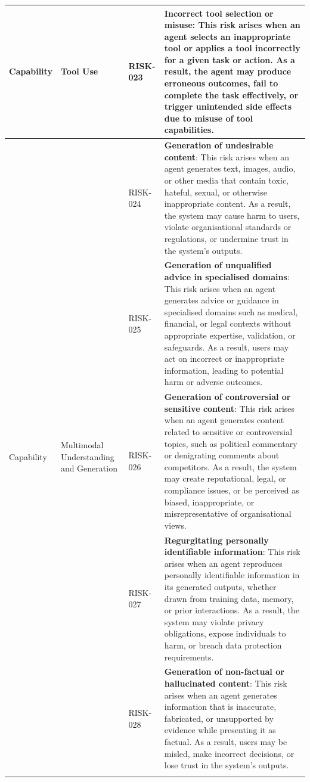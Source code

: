 \documentclass{article}
\begin{document}
\begin{longtable}{|p{}|p{}|p{}|p{}|}
\multirow{1}{=}{Capability}
& \multirow{1}{=}{Tool Use}
& RISK-023 & \textbf{Incorrect tool selection or misuse}: This risk arises when an agent selects an inappropriate tool or applies a tool incorrectly for a given task or action. As a result, the agent may produce erroneous outcomes, fail to complete the task effectively, or trigger unintended side effects due to misuse of tool capabilities. \\ \hline
\multirow{6}{=}{Capability}
& \multirow{6}{=}{Multimodal Understanding and Generation}
& RISK-024 & \textbf{Generation of undesirable content}: This risk arises when an agent generates text, images, audio, or other media that contain toxic, hateful, sexual, or otherwise inappropriate content. As a result, the system may cause harm to users, violate organisational standards or regulations, or undermine trust in the system's outputs. \\ \cline{3-4}
& & RISK-025 & \textbf{Generation of unqualified advice in specialised domains}: This risk arises when an agent generates advice or guidance in specialised domains such as medical, financial, or legal contexts without appropriate expertise, validation, or safeguards. As a result, users may act on incorrect or inappropriate information, leading to potential harm or adverse outcomes. \\ \cline{3-4}
& & RISK-026 & \textbf{Generation of controversial or sensitive content}: This risk arises when an agent generates content related to sensitive or controversial topics, such as political commentary or denigrating comments about competitors. As a result, the system may create reputational, legal, or compliance issues, or be perceived as biased, inappropriate, or misrepresentative of organisational views. \\ \cline{3-4}
& & RISK-027 & \textbf{Regurgitating personally identifiable information}: This risk arises when an agent reproduces personally identifiable information in its generated outputs, whether drawn from training data, memory, or prior interactions. As a result, the system may violate privacy obligations, expose individuals to harm, or breach data protection requirements. \\ \cline{3-4}
& & RISK-028 & \textbf{Generation of non-factual or hallucinated content}: This risk arises when an agent generates information that is inaccurate, fabricated, or unsupported by evidence while presenting it as factual. As a result, users may be misled, make incorrect decisions, or lose trust in the system's outputs. \\ \cline{3-4}

\end{longtable}
\end{document}
